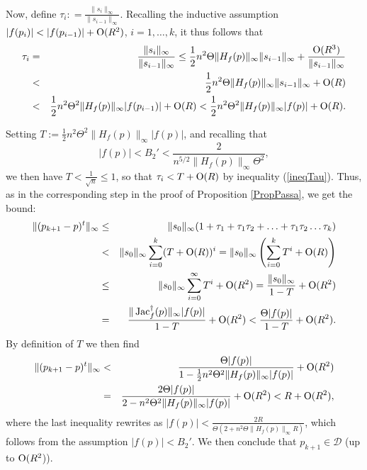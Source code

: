 \documentclass[10pt]{article}
\def\Jac{\mathop{\rm Jac}\nolimits}
\begin{document}
{\begin{eqnarray*}
\end{eqnarray*}
Now, define $\tau_i : =\frac{\|s_i\|_\infty}{\|s_{i-1}\|_\infty}$.  Recalling  the inductive assumption $ |f(p_i)| <  |f(p_{i-1})|+{\rm O}(R^2)$, $i=1,\ldots,k$,
it thus follows that 
\begin{eqnarray}\label{ineqTau}
\tau_i &=& \frac{\|s_i\|_\infty}{\|s_{i-1}\|_\infty} 
\le \frac{1}{2} n^2 \Theta \|H_f(p)\|_\infty  \|s_{i-1}\|_\infty + \frac{{\rm O}(R^3)}{\|s_{i-1}\|_\infty} \nonumber\\
&<& \frac{1}{2} n^2 \Theta \|H_f(p)\|_\infty  \|s_{i-1}\|_\infty + {\rm O}(R) \nonumber \\
&<& \frac{1}{2} n^2 \Theta^2 \|H_f(p)\|_\infty  |f(p_{i-1})| + {\rm O}(R) 
< \frac{1}{2} n^2 \Theta^2 \|H_f(p)\|_\infty  |f(p)| +{\rm O}(R). 
\end{eqnarray}

Setting  $T:=\frac{1}{2} n^2 \Theta^2 \|H_f(p)\|_\infty  |f(p)|$, and recalling that
 $$|f(p)| < B_2' < \frac{2}{n^{5/2} \|H_f(p)\|_\infty \Theta^2 }, $$ we then have
$T <\frac{1}{\sqrt{n}}\leq 1$,
so that  $\tau_i<T + {\rm O}(R)$ by  inequality (\ref{ineqTau}).
Thus, as in  the corresponding step in the proof of Proposition \ref{PropPassa}, we get the bound:
\begin{eqnarray*}
\|(p_{k+1} -p)^t\|_\infty 
&\leq & \|s_0\|_\infty (1 + \tau_1+\tau_1\tau_2 +\ldots + \tau_1\tau_2 \dots \tau_k)\\
&<& \|s_0\|_\infty \sum_{i=0}^k (T + {\rm O}(R))^i = 
\|s_0\|_\infty \left (\sum_{i=0}^k T^i +  {\rm O}(R)\right)\\
&\leq& \|s_0\|_\infty  \sum_{i=0}^\infty T^i + {\rm O}(R^2)  =\frac{\|s_0\|_\infty}{1- T} + {\rm O}(R^2)\\
&=& \frac{\| \Jac_f^\dagger(p)\|_\infty |f(p)|}{1- T} + {\rm O}(R^2)<
 \frac{\Theta |f(p)|}{1- T} + {\rm O}(R^2).
\end{eqnarray*}
By  definition of $T$ 
we then find
\begin{eqnarray*}
\|(p_{k+1} -p)^t\|_\infty &<& 
\frac{\Theta |f(p)|}{1- \frac{1}{2} n^2 \Theta^2 \|H_f(p)\|_\infty |f(p)|} +{\rm O}(R^2)\\ 
&=& \frac{2 \Theta |f(p)|}{2- n^2 \Theta^2 \|H_f(p)\|_\infty |f(p)|} +{\rm O}(R^2)
< R + {\rm O}(R^2),
\end{eqnarray*}
where the last inequality rewrites as $|f(p)|<\frac{2R}{\Theta(2+n^2\Theta \|H_f(p)\|_\infty R)}$, which follows  from the assumption $|f(p)|<B_2'$.
We then conclude that $p_{k+1} \in \mathcal D$ (up to ${\rm O}(R^2$)). 

}
\end{document}
